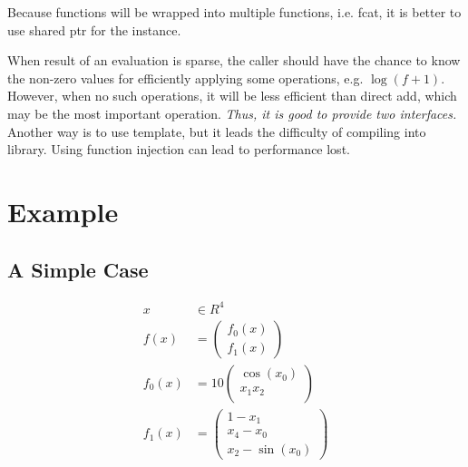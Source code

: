 \documentclass[9pt,twocolumn]{extarticle}
\begin{document}
Because functions will be wrapped into multiple functions, i.e. fcat,
it is better to use shared ptr for the instance.

When result of an evaluation is sparse, the caller should have the
chance to know the non-zero values for efficiently applying some
operations, e.g. $\log(f+1)$.  However, when no such operations, it
will be less efficient than direct add, which may be the most
important operation.  {\em Thus, it is good to provide two
  interfaces.}  Another way is to use template, but it leads the
difficulty of compiling into library. Using function injection can
lead to performance lost.

\section{Example}

\subsection{A Simple Case}
\begin{equation}
  \begin{split}
    x&\in R^4\\
    f(x) &=
    \begin{pmatrix}
      f_0(x)\\
      f_1(x)
    \end{pmatrix}\\
    f_0(x) &= 10
    \begin{pmatrix}
      \cos(x_0)\\
      x_1x_2\\
    \end{pmatrix}\\
    f_1(x) &=
    \begin{pmatrix}
      1-x_1\\
      x_4-x_0\\
      x_2-\sin(x_0)
    \end{pmatrix}
  \end{split}
\end{equation}
\end{document}
